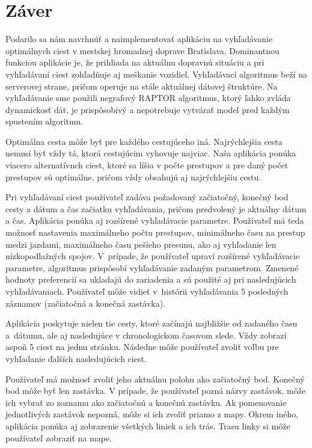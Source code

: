 \chapter*{Záver}  %

Podarilo sa nám navrhnúť a naimplementovať aplikáciu na vyhľadávanie optimálnych ciest v mestskej hromadnej doprave Bratislava. Dominantnou funkciou aplikácie je, že prihliada na aktuálnu dopravnú situáciu a pri vyhľadávaní ciest zohľadňuje aj meškanie vozidiel. Vyhľadávací algoritmus beží na serverovej strane, pričom operuje na stále aktuálnej dátovej štruktúre. Na vyhľadávanie sme použili negrafový RAPTOR algoritmus, ktorý ľahko zvláda dynamickosť dát, je prispôsobivý a nepotrebuje vytvárať model pred každým spustením algoritmu. 

Optimálna cesta môže byť pre každého cestujúceho iná. Najrýchlejšia cesta nemusí byť vždy tá, ktorá cestujúcim vyhovuje najviac. Naša aplikácia ponúka viacero alternatívnch ciest, ktoré sa líšia v počte prestupov a pre daný počet prestupov sú optimálne, pričom vždy obsahujú aj najrýchlejšiu cestu. 

Pri vyhľadávaní ciest používateľ zadáva požadovaný začiatočný, konečný bod cesty a dátum a čas začiatku vyhľadávania, pričom predvolený je aktuálny dátum a čas. Aplikácia ponúka aj rozšírené vyhľadávacie parametre. Používateľ má teda možnosť nastavenia maximálneho počtu prestupov, minimálneho času na prestup medzi jazdami, maximálneho času pešieho presunu, ako aj vyhľadanie len nízkopodlažných spojov. V~prípade, že používateľ upraví rozšírené vyhľadávacie parametre, algoritmus prispôsobí vyhľadávanie zadaným parametrom. Zmenené hodnoty preferencií sa ukladajú do zariadenia a sú použité aj pri nasledujúcich vyhľadávaniach. Používateľ môže vidieť v~histórii vyhľadávania 5 posledných záznamov (začiatočná a konečná zastávka). 

Aplikácia poskytuje nielen tie cesty, ktoré začínajú najbližšie od zadaného času a~dátumu, ale aj nasledujúce v chronologickom časovom slede. Vždy zobrazí aspoň 5 ciest na jednu stránku. Následne môže používateľ zvoliť voľbu pre vyhľadanie ďalších nasledujúcich ciest.

Používateľ má možnosť zvoliť jeho aktuálnu polohu ako začiatočný bod. Konečný bod môže byť len zastávka. V prípade, že používateľ pozná názvy zastávok, môže ich vybrať zo zoznamu ako začiatočnú a konečnú zastávku. Ak pomenovanie jednotlivých zastávok nepozná, môže si ich zvoliť priamo z mapy. Okrem iného, aplikácia ponúka aj zobrazenie všetkých liniek a ich trás. Trasu linky si môže používateľ zobraziť na mape. 

